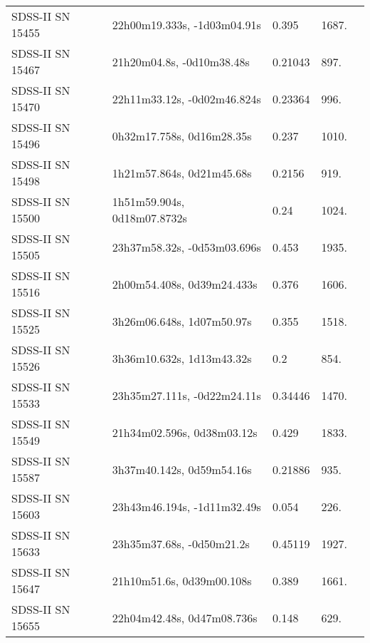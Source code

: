 \begin{longtable}{lllll}
 SDSS-II SN 15455 &    22h00m19.333s, -1d03m04.91s &    0.395 &          1687. &    \citet{2010ApJ...713.1026D} \\
 SDSS-II SN 15467 &      21h20m04.8s, -0d10m38.48s &  0.21043 &           897. &    \citet{2011ApJ...740...92G} \\
 SDSS-II SN 15470 &    22h11m33.12s, -0d02m46.824s &  0.23364 &           996. &    \citet{2016SDSSD.C...0000:} \\
 SDSS-II SN 15496 &      0h32m17.758s, 0d16m28.35s &    0.237 &          1010. &    \citet{2010ApJ...713.1026D} \\
 SDSS-II SN 15498 &      1h21m57.864s, 0d21m45.68s &   0.2156 &           919. &    \citet{2016SDSSD.C...0000:} \\
 SDSS-II SN 15500 &    1h51m59.904s, 0d18m07.8732s &     0.24 &          1024. &    \citet{2011ApJ...738..162S} \\
 SDSS-II SN 15505 &    23h37m58.32s, -0d53m03.696s &    0.453 &          1935. &    \citet{2011ApJ...738..162S} \\
 SDSS-II SN 15516 &     2h00m54.408s, 0d39m24.433s &    0.376 &          1606. &    \citet{2011ApJ...738..162S} \\
 SDSS-II SN 15525 &      3h26m06.648s, 1d07m50.97s &    0.355 &          1518. &    \citet{2010ApJ...713.1026D} \\
 SDSS-II SN 15526 &      3h36m10.632s, 1d13m43.32s &      0.2 &           854. &    \citet{2011ApJ...738..162S} \\
 SDSS-II SN 15533 &    23h35m27.111s, -0d22m24.11s &  0.34446 &          1470. &    \citet{2016SDSSD.C...0000:} \\
 SDSS-II SN 15549 &     21h34m02.596s, 0d38m03.12s &    0.429 &          1833. &    \citet{2011ApJ...738..162S} \\
 SDSS-II SN 15587 &      3h37m40.142s, 0d59m54.16s &  0.21886 &           935. &    \citet{2003SDSS1.C...0000:} \\
 SDSS-II SN 15603 &    23h43m46.194s, -1d11m32.49s &    0.054 &           226. &    \citet{2011ApJ...738..162S} \\
 SDSS-II SN 15633 &      23h35m37.68s, -0d50m21.2s &  0.45119 &          1927. &    \citet{2016SDSSD.C...0000:} \\
 SDSS-II SN 15647 &      21h10m51.6s, 0d39m00.108s &    0.389 &          1661. &    \citet{2011ApJ...738..162S} \\
 SDSS-II SN 15655 &     22h04m42.48s, 0d47m08.736s &    0.148 &           629. &    \citet{2011ApJ...738..162S} \\

\end{longtable}
